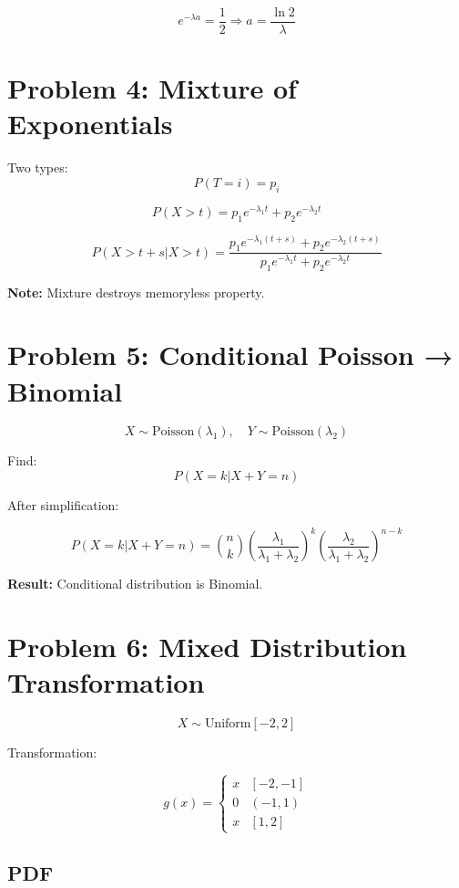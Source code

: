 \documentclass[11pt]{article}
\begin{document}
\[
e^{-\lambda a}=\frac12
\Rightarrow
\boxed{a=\frac{\ln 2}{\lambda}}
\]

\section{Problem 4: Mixture of Exponentials}

Two types:
\[
P(T=i)=p_i
\]

\[
P(X>t)=p_1 e^{-\lambda_1 t}+p_2 e^{-\lambda_2 t}
\]

\[
P(X>t+s|X>t)
=
\frac{
p_1 e^{-\lambda_1(t+s)}+
p_2 e^{-\lambda_2(t+s)}
}{
p_1 e^{-\lambda_1 t}+
p_2 e^{-\lambda_2 t}
}
\]

\textbf{Note:} Mixture destroys memoryless property.

\section{Problem 5: Conditional Poisson → Binomial}

\[
X \sim \text{Poisson}(\lambda_1),
\quad
Y \sim \text{Poisson}(\lambda_2)
\]

Find:
\[
P(X=k|X+Y=n)
\]

After simplification:

\[
\boxed{
P(X=k|X+Y=n)
=
\binom{n}{k}
\left(
\frac{\lambda_1}{\lambda_1+\lambda_2}
\right)^k
\left(
\frac{\lambda_2}{\lambda_1+\lambda_2}
\right)^{n-k}
}
\]

\textbf{Result:} Conditional distribution is Binomial.

\section{Problem 6: Mixed Distribution Transformation}

\[
X \sim \text{Uniform}[-2,2]
\]

Transformation:

\[
g(x)=
\begin{cases}
x & [-2,-1] \\
0 & (-1,1) \\
x & [1,2]
\end{cases}
\]

\subsection*{PDF}
\end{document}
